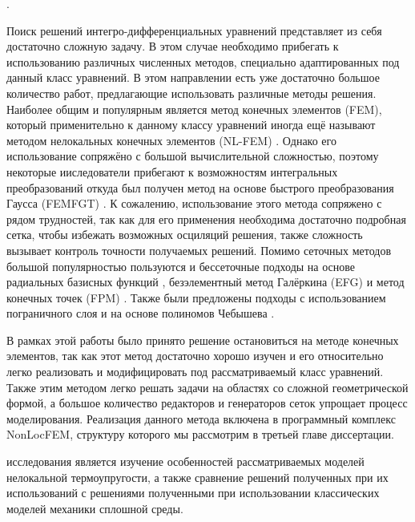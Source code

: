 \cite{SaintVenant}.

Поиск решений интегро-дифференциальных уравнений представляет из себя достаточно сложную задачу. В этом случае необходимо прибегать к использованию различных численных методов, специально адаптированных под данный класс уравнений. В этом направлении есть уже достаточно большое количество работ, предлагающие использовать различные методы решения. Наиболее общим и популярным является метод конечных элементов (FEM), который применительно к данному классу уравнений иногда ещё называют методом нелокальных конечных элементов (NL-FEM) \cite{Polizzotto2, Pisano1}. Однако его использование сопряжёно с большой вычислительной сложностью, поэтому некоторые ииследователи прибегают к возможностям интегральных преобразований откуда был получен метод на основе быстрого преобразования Гаусса (FEMFGT) \cite{FastGaussTransform}. К сожалению, использование этого метода сопряжено с рядом трудностей, так как для его применения необходима достаточно подробная сетка, чтобы избежать возможных осциляций решения, также сложность вызывает контроль точности получаемых решений. Помимо сеточных методов большой популярностью пользуются и бессеточные подходы на основе радиальных базисных функций \cite{RadialBasis}, безэлементный метод Галёркина (EFG) и метод конечных точек (FPM) \cite{MeshFree}. Также были предложены подходы с использованием пограничного слоя \cite{BondaryLayer} и на основе полиномов Чебышева \cite{ChebPolynom}.

В рамках этой работы было принято решение остановиться на методе конечных элементов, так как этот метод достаточно хорошо изучен и его относительно легко реализовать и модифицировать под рассматриваемый класс уравнений. Также этим методом легко решать задачи на областях со сложной геометрической формой, а большое количество редакторов и генераторов сеток упрощает процесс моделирования. Реализация данного метода включена в программный комплекс NonLocFEM, структуру которого мы рассмотрим в третьей главе диссертации.



{\aim}
исследования является изучение особенностей рассматриваемых моделей нелокальной термоупругости, а также сравнение решений полученных при их использований с решениями полученными при использовании классических моделей механики сплошной среды.

